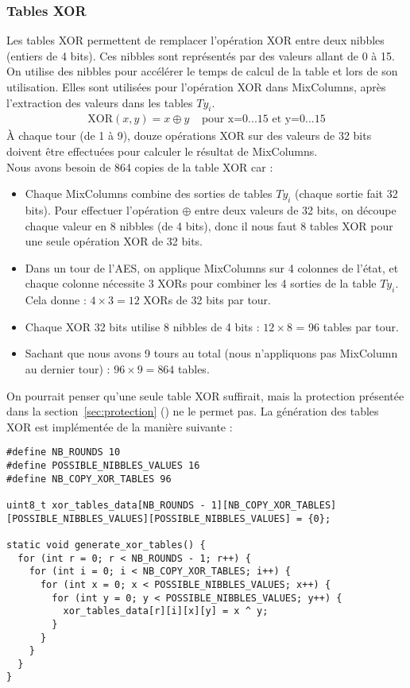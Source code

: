 \documentclass[a4paper, 10pt]{article}
\begin{document}
  \subsubsection{Tables XOR}
  \normalsize
  Les tables XOR permettent de remplacer l’opération XOR entre deux nibbles 
  (entiers de 4 bits). Ces nibbles sont représentés par des valeurs allant de 
  0 à 15. On utilise des nibbles pour accélérer le temps de calcul de la table et lors de son utilisation.
  Elles sont utilisées pour l’opération XOR dans MixColumns, après 
  l’extraction des valeurs dans les tables \(Ty_{i}\). 
  \begin{align*}
    \text{XOR}(x, y) = x \oplus y & \text{  pour x=0...15 et y=0...15}
  \end{align*}
  À chaque tour (de 1 à 9), douze opérations XOR sur des valeurs de 32 bits doivent être 
  effectuées pour calculer le résultat de MixColumns. \\
  Nous avons besoin de 864 copies de la table XOR car :
  \begin{itemize}
    \item Chaque MixColumns combine des sorties de tables \(Ty_{i}\) (chaque sortie fait 32 bits). Pour effectuer 
    l'opération $\oplus$ entre deux valeurs de 32 bits, on découpe chaque valeur en 8 nibbles (de 4 bits), donc il 
    nous faut 8 tables XOR pour une seule opération XOR de 32 bits. 
    \item Dans un tour de l'AES, on applique MixColumns sur 4 colonnes de l'état, et chaque colonne nécessite 
    3 XORs pour combiner les 4 sorties de la table \(Ty_{i}\). Cela donne : $4 \times 3 = 12$ XORs de 32 bits par tour.
    \item Chaque XOR 32 bits utilise 8 nibbles de 4 bits : $12 \times 8$ = 96 tables par tour.
    \item Sachant que nous avons 9 tours au total (nous n'appliquons pas MixColumn au dernier tour) : $96 \times 9 = 864$ tables.
  \end{itemize}
  On pourrait penser qu’une seule table XOR suffirait, 
  mais la protection présentée dans la section~\ref{sec:protection} () ne le permet pas.
  La génération des tables XOR est implémentée de la manière suivante :
\scriptsize{
\begin{verbatim}
#define NB_ROUNDS 10
#define POSSIBLE_NIBBLES_VALUES 16
#define NB_COPY_XOR_TABLES 96

uint8_t xor_tables_data[NB_ROUNDS - 1][NB_COPY_XOR_TABLES]
[POSSIBLE_NIBBLES_VALUES][POSSIBLE_NIBBLES_VALUES] = {0};

static void generate_xor_tables() {
  for (int r = 0; r < NB_ROUNDS - 1; r++) {
    for (int i = 0; i < NB_COPY_XOR_TABLES; i++) {
      for (int x = 0; x < POSSIBLE_NIBBLES_VALUES; x++) {
        for (int y = 0; y < POSSIBLE_NIBBLES_VALUES; y++) {
          xor_tables_data[r][i][x][y] = x ^ y;
        }
      }
    }
  }
}
    \end{verbatim}
  }
\end{document}
